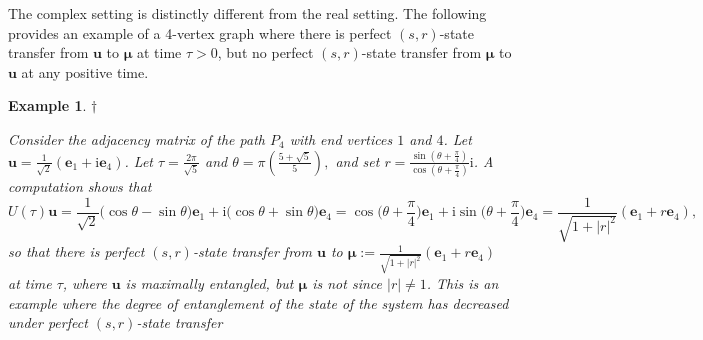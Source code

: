 \documentclass{article}
\numberwithin{equation}{section}
\newtheorem{ex}[lemma]{Example}
\newcommand{\be}{\mathbf e}
\newcommand{\bu}{\mathbf u}
\newcommand{\bmu}{{\boldsymbol{\mu}}}
\def\ii{\mathrm{i}}
\begin{document}
{The complex setting is  distinctly different from the real setting. The following provides an example of a 4-vertex graph where there is perfect $(s,r)$-state transfer from $\bu$ to $\bmu$ at time $\tau>0$, but no perfect $(s,r)$-state transfer from $\bmu$ to $\bu$ at any positive time. 
\begin{ex}\label{ex:p4}$\dagger$ {\rm{
    Consider the adjacency matrix of the path $P_4$ with end vertices $1$ and $4$. %
    Let $\bu=%
    \frac{1}{\sqrt{2}}(\be_1+\ii\be_4)$. Let $\tau= \frac{2\pi}{\sqrt{5}}$ and $\theta = \pi\left(\frac{5+\sqrt{5}}{5}\right),$ and set $r=\frac{\sin(\theta+\frac{\pi}{4})}{\cos(\theta+\frac{\pi}{4})}\ii$. A computation shows that 
\begin{equation}
\label{p4}
U(\tau)\bu=\frac{1}{\sqrt{2}} 
\big(
  \cos \theta - \sin \theta\big)\be_1+\ii\big(  \cos \theta + \sin \theta\big)\be_4= 
    \cos\bigg(\theta + \frac{\pi}{4}\bigg)\be_1+\ii\sin\bigg(\theta + \frac{\pi}{4}\bigg)\be_4
=\frac{1}{\sqrt{1+|r|^2}}(\be_1+r\be_4),
\end{equation}
so that there is perfect $(s,r)$-state transfer from $\bu$ to $\bmu:=\frac{1}{\sqrt{1+|r|^2}}(\be_1+r\be_4)$ at time $\tau$, where 
$\bu$ is maximally entangled, but $\bmu$ is not since $|r|\ne 1$. This is an example where the degree of entanglement of the state of the system has decreased under perfect $(s,r)$-state transfer

}}
\end{ex}}
\end{document}

